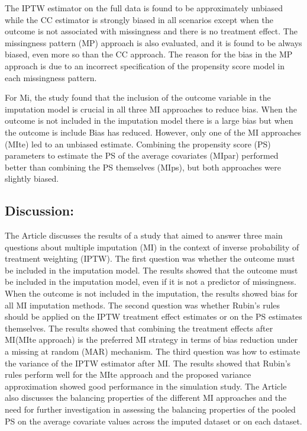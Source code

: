 \documentclass{article}
\begin{document}
The IPTW estimator on the full data is found to be approximately
unbiased while the CC estimator is strongly biased in all scenarios
except when the outcome is not associated with missingness and there is
no treatment effect. The missingness pattern (MP) approach is also
evaluated, and it is found to be always biased, even more so than the CC
approach. The reason for the bias in the MP approach is due to an
incorrect specification of the propensity score model in each
missingness pattern.

For Mi, the study found that the inclusion of the outcome variable in
the imputation model is crucial in all three MI approaches to reduce
bias. When the outcome is not included in the imputation model there is
a large bias but when the outcome is include Bias has reduced. However,
only one of the MI approaches (MIte) led to an unbiased estimate.
Combining the propensity score (PS) parameters to estimate the PS of the
average covariates (MIpar) performed better than combining the PS
themselves (MIps), but both approaches were slightly biased.

\hypertarget{discussion}{%
\subsection{Discussion:}\label{discussion}}

The Article discusses the results of a study that aimed to answer three
main questions about multiple imputation (MI) in the context of inverse
probability of treatment weighting (IPTW). The first question was
whether the outcome must be included in the imputation model. The
results showed that the outcome must be included in the imputation
model, even if it is not a predictor of missingness. When the outcome is
not included in the imputation, the results showed bias for all MI
imputation methods. The second question was whether Rubin's rules should
be applied on the IPTW treatment effect estimates or on the PS estimates
themselves. The results showed that combining the treatment effects
after MI(MIte approach) is the preferred MI strategy in terms of bias
reduction under a missing at random (MAR) mechanism. The third question
was how to estimate the variance of the IPTW estimator after MI. The
results showed that Rubin's rules perform well for the MIte approach and
the proposed variance approximation showed good performance in the
simulation study. The Article also discusses the balancing properties of
the different MI approaches and the need for further investigation in
assessing the balancing properties of the pooled PS on the average
covariate values across the imputed dataset or on each dataset.
\end{document}
